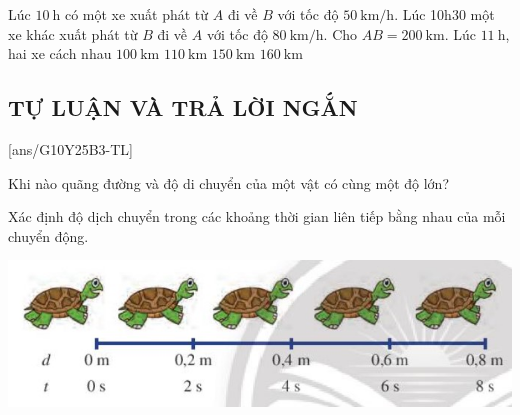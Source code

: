 \begin{ex}
	Lúc $\SI{10}{\hour}$ có một xe xuất phát từ $A$ đi về $B$ với tốc độ $\SI{50}{\kilo\meter/\hour}$. Lúc 10h30 một xe khác xuất phát từ $B$ đi về $A$ với tốc độ $\SI{80}{\kilo\meter/\hour}$. Cho $AB =\SI{200}{\kilo\meter}$. Lúc $\SI{11}{\hour}$, hai xe cách nhau
		\choice
		{$\SI{100}{\kilo\meter}$}
		{\True $\SI{110}{\kilo\meter}$}
		{$\SI{150}{\kilo\meter}$}
		{$\SI{160}{\kilo\meter}$}
	
	\loigiai{}
\end{ex}

\begin{ex}
	\loigiai{}
\end{ex}
\subsection{TỰ LUẬN VÀ TRẢ LỜI NGẮN}
\setcounter{ex}{0}
[ans/G10Y25B3-TL]
\begin{ex}
	Khi nào quãng đường và độ di chuyển của một vật có cùng một độ lớn?
\end{ex}

\begin{ex}
	Xác định độ dịch chuyển trong các khoảng thời gian liên tiếp bằng nhau của mỗi chuyển động.
	
	\begin{center}
		\includegraphics[scale=0.6]{figs/G10Y25B3-8}
	\end{center}
\end{ex}

